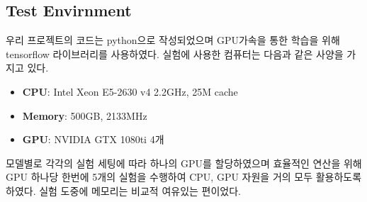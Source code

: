 \subsection{Test Envirnment}
\label{sec:dev:environment}
우리 프로젝트의 코드는 python으로 작성되었으며 GPU가속을 통한 학습을 위해 tensorflow 라이브러리를 사용하였다.
실험에 사용한 컴퓨터는 다음과 같은 사양을 가지고 있다.
\begin{itemize}
	\item \textbf{CPU}:
		Intel Xeon E5-2630 v4 2.2GHz, 25M cache
	\item \textbf{Memory}:
		500GB, 2133MHz
	\item \textbf{GPU}:
		NVIDIA GTX 1080ti 4개
\end{itemize}
모델별로 각각의 실험 세팅에 따라 하나의 GPU를 할당하였으며 효율적인 연산을 위해 GPU 하나당 한번에 5개의 실험을 수행하여 CPU, GPU 자원을 거의 모두 활용하도록 하였다.
실험 도중에 메모리는 비교적 여유있는 편이었다.


